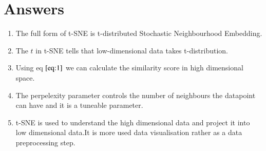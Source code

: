 \documentclass[journal,12pt,onecolumn]{IEEEtran}
\theoremstyle{remark}
\numberwithin{equation}{section}
\begin{document}
	   \section{Answers}
	    \begin{enumerate}
	      \item The full form of t-SNE is t-distributed Stochastic Neighbourhood Embedding.
	      \item The $t$ in t-SNE tells that low-dimensional data takes t-distribution.
	      \item Using eq $\eqref{eq:1}$ we can calculate the similarity score in high dimensional space.
	      \item The perpelexity parameter controls the number of neighbours the datapoint can have and it is a tuneable parameter.
	      \item t-SNE is used to understand the high dimensional data and project it into low dimensional data.It is more used data visualisation rather as a data preprocessing step.
	    \end{enumerate}
        
\end{document}
